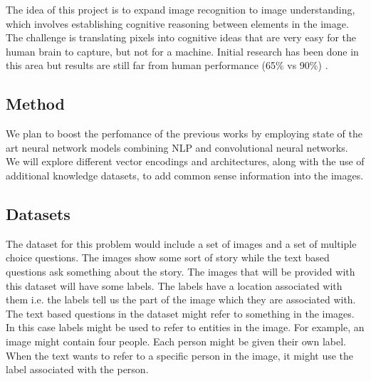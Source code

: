 \documentclass[11pt,a4paper]{article}
\begin{document}
The idea of this project is to expand image recognition to image understanding, which involves establishing cognitive reasoning between elements in the image. The challenge is translating pixels into cognitive ideas that are very easy for the human brain to capture, but not for a machine. Initial research has been done in this area but results are still far from human performance (65\% vs 90\%) \cite{zellers2018recognition}.


\subsection{Method}

We plan to boost the perfomance of the previous works by employing state of the art neural network models combining NLP and convolutional neural networks. We will explore different vector encodings and architectures, along with the use of additional knowledge datasets, to add common sense information into the images.

\subsection{Datasets}
The dataset for this problem would include a set of images and a set of multiple choice questions. The images show some sort of story while the text based questions ask something about the story. The images that will be provided with this dataset will have some labels. The labels have a location associated with them i.e. the labels tell us the part of the image which they are associated with. 
The text based questions in the dataset might refer to something in the images. In this case labels might be used to refer to entities in the image. For example, an image might contain four people. Each person might be given their own label. When the text wants to refer to a specific person in the image, it might use the label associated with the person.



\end{document}
